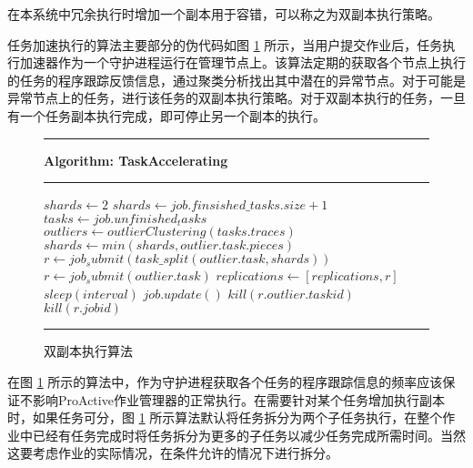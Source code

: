 在本系统中冗余执行时增加一个副本用于容错，可以称之为双副本执行策略。

任务加速执行的算法主要部分的伪代码如图 \ref{fig-acc-algo} 所示，当用户提交作业后，任务执行加速器作为一个守护进程运行在管理节点上。该算法定期的获取各个节点上执行的任务的程序跟踪反馈信息，通过聚类分析找出其中潜在的异常节点。对于可能是异常节点上的任务，进行该任务的双副本执行策略。对于双副本执行的任务，一旦有一个任务副本执行完成，即可停止另一个副本的执行。
\begin{figure}
\rule[-.2pt]{0.9\textwidth}{0.9pt}

\textbf{Algorithm: TaskAccelerating}

\rule[-.2pt]{0.9\textwidth}{0.5pt}

\begin{algorithmic}[1]

\State $shards\gets 2$
        \State $shards\gets job.finsished\_tasks.size + 1$
    \EndIf
    \State $tasks\gets job.unfinished_tasks$
    \State $outliers\gets outlierClustering(tasks.traces)$
                \State $shards\gets min(shards, outlier.task.pieces)$
                \State $r\gets job_submit(task\_split(outlier.task, shards))$
            \Else{}
                \State $r\gets job_submit(outlier.task)$                
            \EndIf
            \State $replications\gets [replications, r]$
        \EndIf
    \EndFor
    \State $sleep(interval)$
    \State $job.update()$
            \State $kill(r.outlier.taskid)$
            \State $kill(r.jobid)$
        \EndIf
    \EndFor
\EndWhile
\end{algorithmic}
\rule[-.2pt]{0.9\textwidth}{0.8pt}
\caption{双副本执行算法}\label{fig-acc-algo}
\end{figure}

在图 \ref{fig-acc-algo} 所示的算法中，作为守护进程获取各个任务的程序跟踪信息的频率应该保证不影响ProActive作业管理器的正常执行。在需要针对某个任务增加执行副本时，如果任务可分，图 \ref{fig-acc-algo} 所示算法默认将任务拆分为两个子任务执行，在整个作业中已经有任务完成时将任务拆分为更多的子任务以减少任务完成所需时间。当然这要考虑作业的实际情况，在条件允许的情况下进行拆分。

